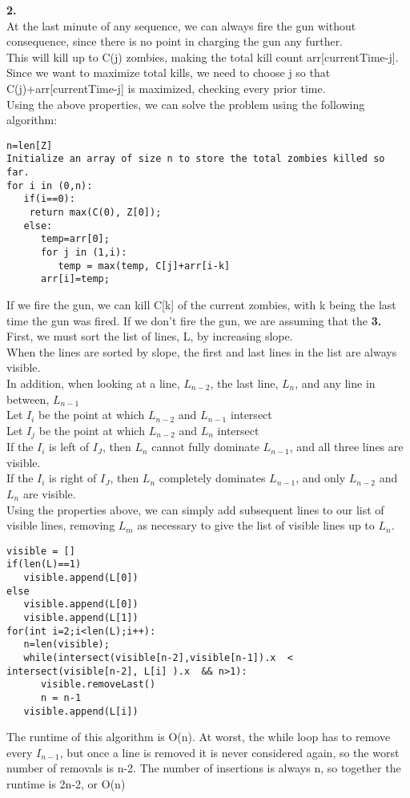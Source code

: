 \documentclass[a4paper,12pt]{article}
\begin{document}
\noindent \textbf{2.} \\
At the last minute of any sequence, we can always fire the gun without consequence, since there is no point in charging the gun any further. \\
This will kill up to C(j) zombies, making the total kill count arr[currentTime-j]. \\
Since we want to maximize total kills, we need to choose j so that C(j)+arr[currentTime-j] is maximized, checking every prior time.  \\
Using the above properties, we can solve the problem using the following algorithm:
\begin{lstlisting}
n=len[Z]
Initialize an array of size n to store the total zombies killed so far.
for i in (0,n):
   if(i==0):
	return max(C(0), Z[0]);
   else:
      temp=arr[0];
      for j in (1,i):
         temp = max(temp, C[j]+arr[i-k]
      arr[i]=temp;
\end{lstlisting}
If we fire the gun, we can kill C[k] of the current zombies, with k being the last time the gun was fired. 
If we don't fire the gun, we are assuming that the  
\noindent \textbf{3.} \\
First, we must sort the list of lines, L, by increasing slope. \\
When the lines are sorted by slope, the first and last lines in the list are always visible. \\
In addition, when looking at a line, $L_{n-2}$, the last line, $L_n$, and any line in between, $L_{n-1}$ \\
Let $I_i$ be the point at which $L_{n-2}$ and $L_{n-1}$ intersect \\
Let $I_j$ be the point at which $L_{n-2}$ and $L_n$ intersect \\
If the $I_i$ is left of $I_J$, then $L_n$ cannot fully dominate $L_{n-1}$, and all three lines are visible. \\
If the $I_i$ is right of $I_J$, then $L_n$ completely dominates $L_{n-1}$, and only $L_{n-2}$ and $L_n$ are visible. \\

Using the properties above, we can simply add subsequent lines to our list of visible lines, removing $L_m$ as necessary to give the list of visible lines up to 
$L_n$.
\begin{lstlisting}
visible = []
if(len(L)==1)
   visible.append(L[0])
else
   visible.append(L[0])
   visible.append(L[1])
for(int i=2;i<len(L);i++):
   n=len(visible);
   while(intersect(visible[n-2],visible[n-1]).x  < intersect(visible[n-2], L[i] ).x  && n>1):
      visible.removeLast()
      n = n-1
   visible.append(L[i])
\end{lstlisting}
The runtime of this algorithm is O(n). At worst, the while loop has to remove every $I_{n-1}$, but once a line is removed it is never considered again, so the worst number of removals is n-2. The number of insertions is always n, so together the runtime is 2n-2, or O(n)
\end{document}
